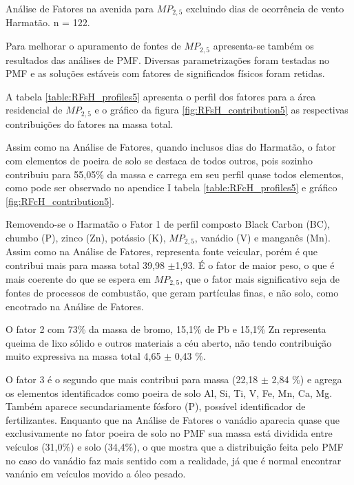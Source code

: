 \begin{table}[H]
  \centering
  
  \caption{Análise de Fatores na avenida para $MP_{2,5}$
           excluindo dias de ocorrência de vento Harmatão. n = 122.
          \label{table:AF_TFsH5}}
\end{table}
\newpage

Para melhorar o apuramento de fontes de $MP_{2,5}$ apresenta-se também os
resultados das análises de PMF. Diversas parametrizações foram testadas no PMF 
e as soluções estáveis com fatores de significados físicos foram retidas.

A tabela \ref{table:RFsH_profiles5} apresenta o perfil dos fatores para a área
residencial de $MP_{2,5}$ e o gráfico da figura \ref{fig:RFsH_contribution5}
as respectivas contribuições do fatores na massa total. 

Assim como na Análise de Fatores, quando inclusos dias do Harmatão, 
o fator com elementos de poeira de solo se destaca de todos outros, 
pois sozinho contribuiu para 55,05\% da massa 
e carrega em seu perfil quase todos elementos, como pode ser observado 
no apendice I tabela \ref{table:RFcH_profiles5} e gráfico 
\ref{fig:RFcH_contribution5}.

Removendo-se o Harmatão o Fator 1 de perfil composto Black Carbon (BC), 
chumbo (P), zinco (Zn), potássio (K), $MP_{2,5}$, vanádio (V) e manganês (Mn).
Assim como na Análise de Fatores, representa fonte veicular, porém é que 
contribui mais para massa total 39,98 $\pm$1,93. É o fator de maior peso, 
o que é mais coerente do que se espera em $MP_{2,5}$, que o fator mais 
significativo seja de fontes de processos de combustão, que geram partículas
finas, e não solo, como encotrado na Análise de Fatores.

O fator 2 com 73\% da massa de bromo, 15,1\% de Pb e 15,1\% Zn representa 
queima de lixo sólido e outros materiais a céu aberto, não tendo contribuição
muito expressiva na massa total 4,65 $\pm$ 0,43 \%.

O fator 3 é o segundo que mais contribui para massa (22,18 $\pm$ 2,84 \%) 
e agrega os elementos identificados como poeira de solo Al, Si, Ti, V, Fe, Mn, 
Ca, Mg. Também aparece secundariamente fósforo (P), possível identificador de
fertilizantes. Enquanto que na Análise de Fatores o vanádio aparecia
quase que exclusivamente no fator poeira de solo no PMF sua massa está dividida
entre veículos (31,0\%) e solo (34,4\%), o que mostra que a distribuição
feita pelo PMF no caso do vanádio faz mais sentido com a realidade, já que
é normal encontrar vanánio em veículos movido a óleo pesado.

